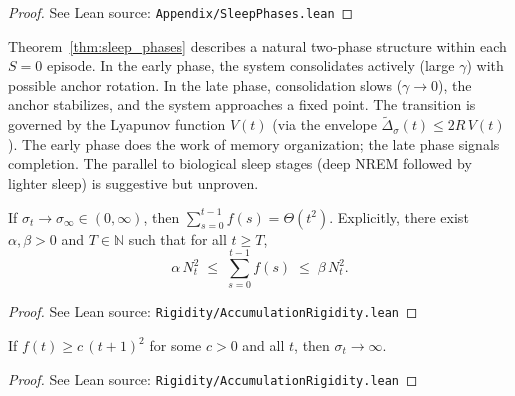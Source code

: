 \begin{proof}
\leanok
{}
See Lean source: \texttt{Appendix/SleepPhases.lean}
\end{proof}

\begin{remark}[Two-phase structure of the $S = 0$ regime]
\label{rem:sleep_stages}
\leanok
{}
Theorem~\ref{thm:sleep_phases} describes a natural two-phase structure within each $S = 0$ episode.  In the early phase, the system consolidates actively (large $\gamma$) with possible anchor rotation.  In the late phase, consolidation slows ($\gamma \to 0$), the anchor stabilizes, and the system approaches a fixed point.  The transition is governed by the Lyapunov function $V(t)$ (via the envelope $\widetilde{\Delta}_\sigma(t) \leq 2R\,V(t)$).  The early phase does the work of memory organization; the late phase signals completion.  The parallel to biological sleep stages (deep NREM followed by lighter sleep) is suggestive but unproven.
\end{remark}

\begin{proposition}
\label{prop:accum_aggregate}
\leanok
{}
If\/ $\sigma_t \to \sigma_\infty \in (0, \infty)$, then
$\sum_{s=0}^{t-1} f(s) = \Theta(t^2)$.  Explicitly, there exist
$\alpha, \beta > 0$ and $T \in \mathbb{N}$ such that for all $t \geq T$,
\[
\alpha\,N_t^2 \;\leq\; \sum_{s=0}^{t-1} f(s) \;\leq\; \beta\,N_t^2.
\]
\end{proposition}

\begin{proof}
\leanok
{}
See Lean source: \texttt{Rigidity/AccumulationRigidity.lean}
\end{proof}

\begin{proposition}
\label{prop:accum_superlinear}
\leanok
{}
If\/ $f(t) \geq c\,(t+1)^2$ for some $c > 0$ and all $t$, then
$\sigma_t \to \infty$.
\end{proposition}

\begin{proof}
\leanok
{}
See Lean source: \texttt{Rigidity/AccumulationRigidity.lean}
\end{proof}

